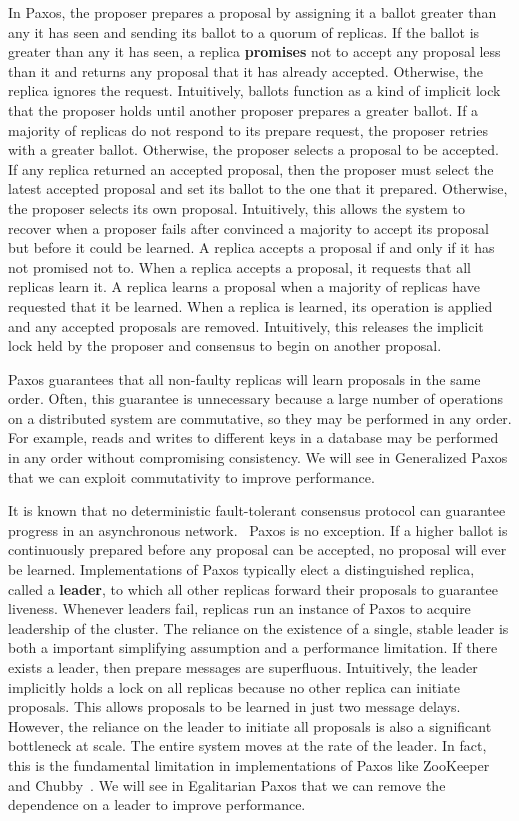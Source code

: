 \documentclass[../main.tex]{subfiles}
\begin{document}
  In Paxos, the proposer prepares a proposal by assigning it a ballot greater than any it has seen
  and sending its ballot to a quorum of replicas. If the ballot is greater than any it has seen, a
  replica \textbf{promises} not to accept any proposal less than it and returns any proposal that it
  has already accepted. Otherwise, the replica ignores the request. Intuitively, ballots function as
  a kind of implicit lock that the proposer holds until another proposer prepares a greater ballot.
  If a majority of replicas do not respond to its prepare request, the proposer retries with a
  greater ballot. Otherwise, the proposer selects a proposal to be accepted. If any replica
  returned an accepted proposal, then the proposer must select the latest accepted proposal and set
  its ballot to the one that it prepared. Otherwise, the proposer selects its own proposal.
  Intuitively, this allows the system to recover when a proposer fails after convinced a
  majority to accept its proposal but before it could be learned. A replica accepts a proposal if
  and only if it has not promised not to. When a replica accepts a proposal, it requests that all
  replicas learn it. A replica learns a proposal when a majority of replicas have requested that it
  be learned. When a replica is learned, its operation is applied and any accepted proposals are
  removed. Intuitively, this releases the implicit lock held by the proposer and consensus to begin
  on another proposal.

  Paxos guarantees that all non-faulty replicas will learn proposals in the same order. Often, this
  guarantee is unnecessary because a large number of operations on a distributed system are
  commutative, so they may be performed in any order. For example, reads and writes to different
  keys in a database may be performed in any order without compromising consistency. We will see in
  Generalized Paxos that we can exploit commutativity to improve performance.

  It is known that no deterministic fault-tolerant consensus protocol can guarantee progress in an
  asynchronous network.~\cite{consensus} Paxos is no exception. If a higher ballot is continuously
  prepared before any proposal can be accepted, no proposal will ever be learned. Implementations of
  Paxos typically elect a distinguished replica, called a \textbf{leader}, to which all other
  replicas forward their proposals to guarantee liveness. Whenever leaders fail, replicas run an
  instance of Paxos to acquire leadership of the cluster. The reliance on the existence of a single,
  stable leader is both a important simplifying assumption and a performance limitation. If there
  exists a leader, then prepare messages are superfluous. Intuitively, the leader implicitly holds
  a lock on all replicas because no other replica can initiate proposals. This allows proposals to
  be learned in just two message delays. However, the reliance on the leader to initiate all
  proposals is also a significant bottleneck at scale. The entire system moves at the rate of the
  leader. In fact, this is the fundamental limitation in implementations of Paxos like ZooKeeper
  ~\cite{zookeeper} and Chubby~\cite{chubby}. We will see in Egalitarian Paxos that we can remove
  the dependence on a leader to improve performance.
\end{document}
